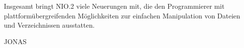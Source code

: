\documentclass[times, 10pt,twocolumn]{article}
\begin{document}
Insgesamt bringt NIO.2 viele Neuerungen mit, die den Programmierer mit plattformübergreifenden Möglichkeiten zur einfachen
Manipulation von Dateien und Verzeichnissen ausstatten. 

JONAS


% 
% 
% 
% 
% 
% 
% 
% 




\jDocIndex
\end{document}
